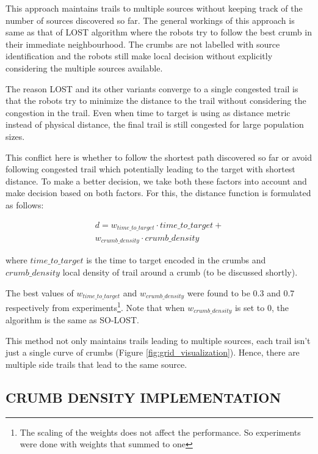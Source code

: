 \documentclass[letterpaper, 10 pt, conference]{ieeeconf}  %
\begin{document}
This approach maintains trails to multiple sources without keeping track of the number of sources discovered so far. The general workings of this approach is same as that of LOST algorithm where the robots try to follow the best crumb in their immediate neighbourhood. The crumbs are not labelled with source identification and the robots still make local decision without explicitly considering the multiple sources available. 

The reason LOST and its other variants converge to a single congested trail is that the robots try to minimize the distance to the trail without considering the congestion in the trail. Even when time to target is using as distance metric instead of physical distance, the final trail is still congested for large population sizes. 

This conflict here is whether to follow the shortest path discovered so far or avoid following congested trail which potentially leading to the target with shortest distance. To make a better decision, we take both these factors into account and make decision based on both factors. For this, the distance function is formulated as follows:

\begin{equation}
\begin{split}
   d = w_{time\_to\_target}  \cdot time\_to\_target + \\
          w_{crumb\_density} \cdot crumb\_density
\end{split}
\end{equation}

where $time\_to\_target$ is the time to target encoded in the crumbs and $crumb\_density$ local density of trail around a crumb (to be discussed shortly).

The best values of $w_{time\_to\_target}$ and $w_{crumb\_density}$ were found to be  $0.3$ and $0.7$ respectively from experiments\footnote{The scaling of the weights does not affect the performance. So experiments were done with weights that summed to one}. Note that when $w_{crumb\_density}$ is set to $0$, the algorithm is the same as SO-LOST.

This method not only maintains trails leading to multiple sources, each trail isn't just a single curve of crumbs (Figure \ref{fig:grid_visualization}). Hence, there are multiple side trails that lead to the same source.

\subsection{CRUMB DENSITY IMPLEMENTATION}
\end{document}

